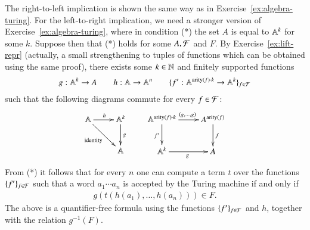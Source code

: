 {The right-to-left implication is shown the same way as in Exercise~\ref{ex:algebra-turing}. For the left-to-right implication, we need a stronger version of Exercise~\ref{ex:algebra-turing}, where in condition (*) the set $A$ is equal to $\mathbb A^k$ for some $k$. Suppose then that (*) holds for some $A,{\mathcal F}$ and $F$. By Exercise~\ref{ex:lift-repr} (actually, a small strengthening to tuples of functions which can be obtained using the same proof), there exists some $k \in {\mathbb N}$ and finitely supported functions
\begin{align*}
 g : \mathbb A^k \to A \qquad h : \mathbb A \to \mathbb A^n \qquad \{f' : \mathbb A^{\text{arity}(f) \cdot k} \to \mathbb A^k\}_{f \in {\mathcal F}}
\end{align*}
such that the following diagrams commute for every $f \in {\mathcal F}$:
\begin{align*}
\xymatrix{\atoms \ar[r]^h \ar[dr]_{\text{identity}} & \atoms^k \ar[d]^g \\ & \atoms} \qquad 
\xymatrix{\atoms^{\text{arity}(f) \cdot k} \ar[d]_{f'} \ar[r]^{(g,\ldots,g)}& A^{\text{arity}(f)} \ar[d]^{f}\\ \atoms^k \ar[r]_g & A}
\end{align*}
From (*) it follows that for every $n$ one can compute a term $t$ over the functions $\{f'\}_{f \in {\mathcal F}}$ such that a word $a_1 \cdots a_n$ is accepted by the Turing machine if and only if 
\begin{align*}
 g(t(h(a_1),\ldots,h(a_n))) \in F.
\end{align*}
The above is a quantifier-free formula using the functions $\{f'\}_{f \in {\mathcal F}}$ and $h$, together with the relation $g^{-1}(F)$.
}




